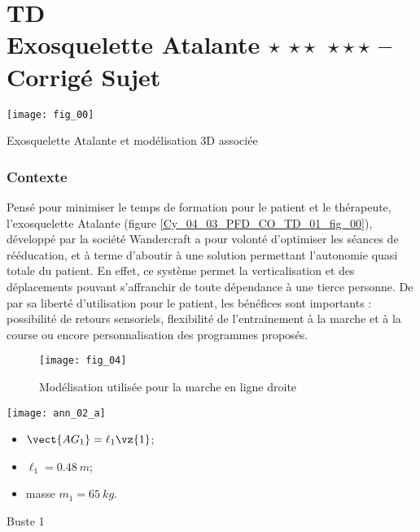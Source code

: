 \chapter*{TD  \\ 
Exosquelette Atalante  \ifnormal $\star$ \else \fi \ifdifficile $\star\star$ \else \fi \iftdifficile $\star\star\star$ \else \fi
-- \ifprof Corrigé \else Sujet \fi}

\iflivret {} \else
\ifprof  {} \else \fi
\fi

\setcounter{question}{0}
\begin{marginfigure}
\texttt{[image: fig\_00]}
\caption{Exosquelette Atalante et modélisation 3D associée \label{Cy_04_03_PFD_CO_TD_01_fig_00}}
\end{marginfigure}


\ifprof
\else
\subsection*{Contexte}

Pensé pour minimiser le temps de formation pour le patient et le thérapeute, l’exosquelette Atalante (figure \ref{Cy_04_03_PFD_CO_TD_01_fig_00}),
 développé par la société Wandercraft a pour volonté d’optimiser les séances de rééducation, et à terme d’aboutir  à une solution permettant l’autonomie quasi totale du patient. En effet, ce système permet la verticalisation et
 des déplacements pouvant s’affranchir de toute dépendance à une tierce personne. De par sa liberté d’utilisation
 pour le patient, les bénéfices sont importants : possibilité de retours sensoriels, flexibilité de l’entrainement à la
 marche et à la course ou encore personnalisation des programmes proposés.


\begin{figure}[!h]
\centering
\texttt{[image: fig\_04]}
\caption{Modélisation utilisée pour la marche en ligne droite \label{Cy_04_03_PFD_CO_TD_01_fig_04}}
\end{figure}

\begin{marginfigure}
\texttt{[image: ann\_02\_a]}
\begin{itemize}
\item $\vect{AG_1}=\ell_1\vz{1}$;
\item $\ell_1 = \SI{0,48}{m}$;
\item masse $m_1 =\SI{65}{kg}$. 
\end{itemize}
\caption{Buste 1 \label{Cy_04_03_PFD_CO_TD_01_ann_02_a}}
\end{marginfigure}


